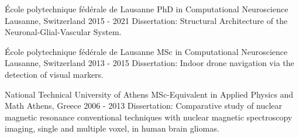 


\begin{cventries}



\cventry
{École polytechnique fédérale de Lausanne} %
{PhD in Computational Neuroscience} %
{Lausanne, Switzerland} %
{2015 - 2021} %
{ %
    Dissertation: Structural Architecture of the Neuronal-Glial-Vascular System.
}


\end{cventries}

\begin{cventries}


\cventry
{École polytechnique fédérale de Lausanne} %
{MSc in Computational Neuroscience} %
{Lausanne, Switzerland} %
{2013 - 2015} %
{ %
    Dissertation: Indoor drone navigation via the detection of visual markers.
}


\end{cventries}

\begin{cventries}


\cventry
{National Technical University of Athens} %
{MSc-Equivalent in Applied Physics and Math} %
{Athens, Greece} %
{2006 - 2013} %
{ %
    Dissertation: Comparative study of nuclear magnetic resonance conventional techniques with nuclear magnetic spectroscopy imaging, single and multiple voxel, in human brain gliomas.
}


\end{cventries}
